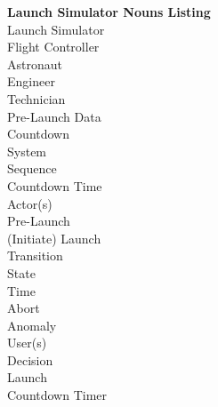 \documentclass[letterpaper]{article}
\begin{document}
\noindent
\textbf{Launch Simulator Nouns Listing}\\
Launch Simulator\\
Flight Controller\\
Astronaut\\
Engineer\\
Technician\\
Pre-Launch Data\\
Countdown\\
System\\
Sequence\\
Countdown Time\\
Actor(s)\\
Pre-Launch\\
(Initiate) Launch\\
Transition\\
State\\
Time\\
Abort\\
Anomaly\\
User(s)\\
Decision\\
Launch\\
Countdown Timer
\end{document}
